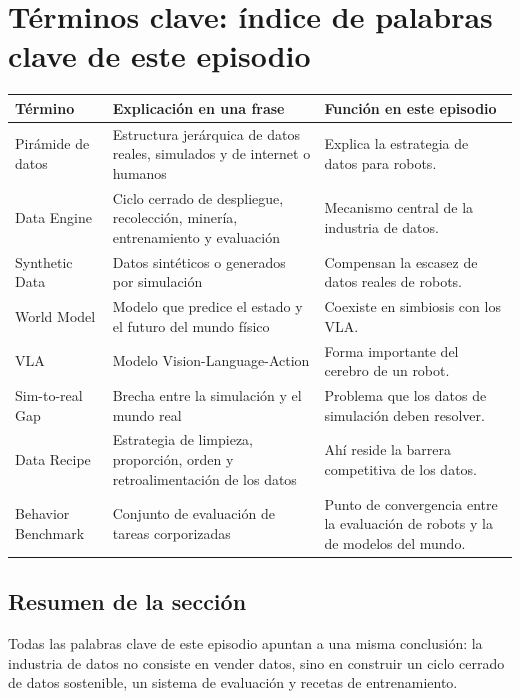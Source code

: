 \section{Términos clave: índice de palabras clave de este episodio}

\begin{longtable}{p{}p{}p{}}
\toprule
Término & Explicación en una frase & Función en este episodio \\
\midrule
Pirámide de datos & Estructura jerárquica de datos reales, simulados y de internet o humanos & Explica la estrategia de datos para robots. \\
Data Engine & Ciclo cerrado de despliegue, recolección, minería, entrenamiento y evaluación & Mecanismo central de la industria de datos. \\
Synthetic Data & Datos sintéticos o generados por simulación & Compensan la escasez de datos reales de robots. \\
World Model & Modelo que predice el estado y el futuro del mundo físico & Coexiste en simbiosis con los VLA. \\
VLA & Modelo Vision-Language-Action & Forma importante del cerebro de un robot. \\
Sim-to-real Gap & Brecha entre la simulación y el mundo real & Problema que los datos de simulación deben resolver. \\
Data Recipe & Estrategia de limpieza, proporción, orden y retroalimentación de los datos & Ahí reside la barrera competitiva de los datos. \\
Behavior Benchmark & Conjunto de evaluación de tareas corporizadas & Punto de convergencia entre la evaluación de robots y la de modelos del mundo. \\
\bottomrule
\end{longtable}

\subsection{Resumen de la sección}

Todas las palabras clave de este episodio apuntan a una misma conclusión: la industria de datos no consiste en vender datos, sino en construir un ciclo cerrado de datos sostenible, un sistema de evaluación y recetas de entrenamiento.

